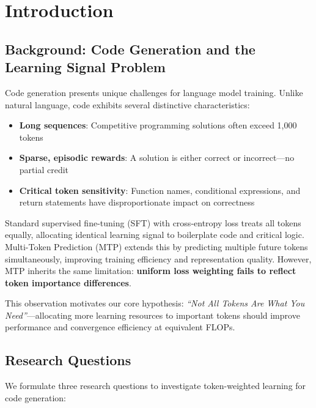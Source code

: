 \section{Introduction}

\subsection{Background: Code Generation and the Learning Signal Problem}

Code generation presents unique challenges for language model training. Unlike natural language, code exhibits several distinctive characteristics:

\begin{itemize}[nosep]
    \item \textbf{Long sequences}: Competitive programming solutions often exceed 1,000 tokens
    \item \textbf{Sparse, episodic rewards}: A solution is either correct or incorrect---no partial credit
    \item \textbf{Critical token sensitivity}: Function names, conditional expressions, and return statements have disproportionate impact on correctness
\end{itemize}

Standard supervised fine-tuning (SFT) with cross-entropy loss treats all tokens equally, allocating identical learning signal to boilerplate code and critical logic. Multi-Token Prediction (MTP) \citep{gloeckle2024better} extends this by predicting multiple future tokens simultaneously, improving training efficiency and representation quality. However, MTP inherits the same limitation: \textbf{uniform loss weighting fails to reflect token importance differences}.

This observation motivates our core hypothesis: \textit{``Not All Tokens Are What You Need''}---allocating more learning resources to important tokens should improve performance and convergence efficiency at equivalent FLOPs.

\subsection{Research Questions}

We formulate three research questions to investigate token-weighted learning for code generation:

